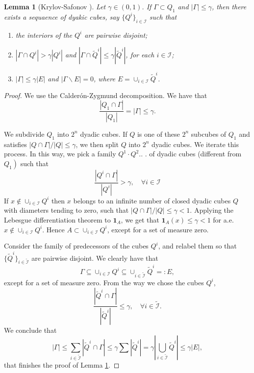 \documentclass[twoside, 12pt]{book}
\numberwithin{equation}{chapter}
\newtheorem{lemma}[theorem]{Lemma}
\def\cI{{\mathcal I}}
\def\leq{\leqslant}
\def\1{{\mathbf{1}}}
\begin{document}
	\begin{lemma}[Krylov-Safonov \cite{krylov1979estimate}]\label{lem:CZ}
		Let $\gamma\in (0,1)$. If $\Gamma\subset Q_1$ and $|\Gamma|\leq \gamma$, then there exists a sequaence of dyakic cubes, say $\{Q^i\}_{i\in \cI}$ such that 
		\begin{enumerate}
			\item the interiors of the $Q^i$ are pairwise disjoint; 
			\item $|\Gamma \cap Q^i|>\gamma |Q^i|$ and $|\Gamma \cap \widetilde{Q}^i|\leq \gamma |\widetilde{Q}^i|$, for each $i\in \cI$; 
			\item $|\Gamma|\leq \gamma |E|$ and $|\Gamma \backslash E|=0$, where $E=\cup_{i\in \cI} \widetilde{Q}^i$. 
		\end{enumerate}
	\end{lemma}
\begin{proof}
    We use the Calderón-Zygmund decomposition. We have that
$$
\frac{\left|Q_1 \cap \Gamma\right|}{\left|Q_1\right|}=|\Gamma| \leq \gamma.
$$

We subdivide $Q_1$ into $2^n$ dyadic cubes. If $Q$ is one of these $2^n$ subcubes of $Q_1$ and satisfies $|Q \cap \Gamma| /|Q| \leq \gamma$, we then split $Q$ into $2^n$ dyadic cubes. We iterate this process. In this way, we pick a family $Q^1 \cdot Q^2$.. . of dyadic cubes (different from $\left.Q_1\right)$ such that
$$
\frac{\left|Q^i \cap \Gamma\right|}{\left|Q^i\right|}>\gamma, \quad \forall i\in \cI
$$
If $x \notin \cup_{i\in \cI} Q^i$ then $x$ belongs to an infinite number of closed dyadic cubes $Q$ with diameters tending to zero, such that $|Q \cap \Gamma| /|Q| \leq \gamma<1$. Applying the Lebesgue differentiation theorem to $\1_A$, we get that $\1_A(x) \leq \gamma<1$ for a.e. $x \notin \cup_{i\in \cI} Q^i$. Hence $A \subset \cup_{i\in \cI} Q^i$, except for a set of measure zero.

Consider the family of predecessors of the cubes $Q^i$, and relabel them so that $\{\widetilde{Q}^i\}_{i \in \widetilde{\cI}}$ are pairwise disjoint. We clearly have that 
\[
    \Gamma \subseteq \cup_{i \in \cI} Q^i \subseteq \cup_{i \in \widetilde{\cI}} \widetilde{Q}^i=: E, 
\]
except for a set of measure zero. From the way we chose the cubes $Q^i$,
$$
\frac{\left|\widetilde{Q}^i \cap \Gamma\right|}{\left|\widetilde{Q}^i\right|} \leq \gamma, \quad \forall i\in \widetilde{\cI}.
$$
We conclude that
$$
|\Gamma| \leq \sum_{i\in \widetilde{\cI}}\left|\widetilde{Q}^i \cap \Gamma\right| \leq \gamma \sum\left|\widetilde{Q}^i\right|=\gamma\left|\bigcup _{i\in\widetilde{\cI}}\widetilde{Q}^i\right| \leq \gamma|E|,
$$
that finishes the proof of Lemma \ref{lem:CZ}. 
\end{proof}
 
\end{document}
